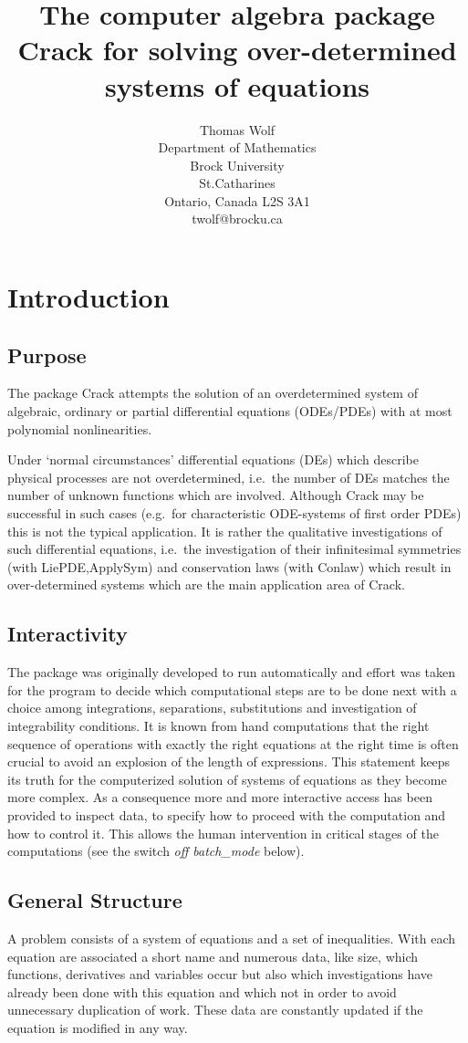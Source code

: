 \documentclass[12pt]{article}
\title{The computer algebra package {\sc Crack}
       for solving over-determined systems of equations}
\author{Thomas Wolf \\
        Department of Mathematics \\
        Brock University \\
        St.Catharines \\
        Ontario, Canada L2S 3A1 \\
        twolf@brocku.ca}
\begin{document}
\maketitle
\tableofcontents

\section{Introduction}
\subsection{Purpose}
The package {\sc Crack} attempts the solution of an overdetermined
system of algebraic, ordinary or partial differential equations
(ODEs/PDEs) with at most polynomial nonlinearities.

Under `normal circumstances' differential equations (DEs) which
describe physical processes are not overdetermined, i.e.\ the number
of DEs matches the number of unknown functions which are involved.
Although {\sc Crack} may be successful in such cases (e.g.\ for
characteristic ODE-systems of first order PDEs) this is not the
typical application. It is rather the qualitative investigations of
such differential equations, i.e.\ the investigation of their
infinitesimal symmetries (with {\sc LiePDE,ApplySym}) and conservation
laws (with {\sc Conlaw}) which result in over-determined systems which
are the main application area of {\sc Crack}.

\subsection{Interactivity}
The package was originally developed to run automatically and effort
was taken for the program to decide which computational steps are to
be done next with a choice among integrations, separations,
substitutions and investigation of integrability conditions. It is
known from hand computations that the right sequence of operations
with exactly the right equations at the right time is often crucial to
avoid an explosion of the length of expressions. This statement keeps
its truth for the computerized solution of systems of equations as
they become more complex. As a consequence more and more interactive
access has been provided to inspect data, to specify how to proceed
with the computation and how to control it. This allows the human
intervention in critical stages of the computations (see the switch
{\em off batch\_mode} below).

\subsection{General Structure}
A problem consists of a system of equations
and a set of inequalities. With each equation are associated a short
name and numerous data, like size, which functions, derivatives and
variables occur but also which investigations have already been done
with this equation and which not in order to avoid unnecessary
duplication of work.  These data are constantly updated if the
equation is modified in any way.
\end{document}
